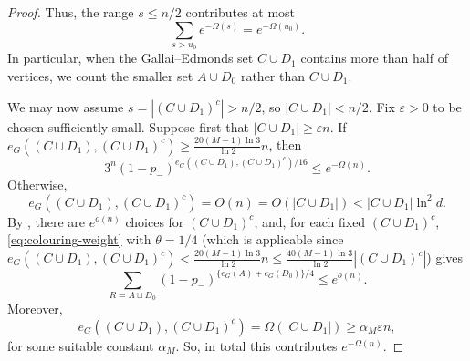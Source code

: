 \documentclass[10pt,a4paper]{amsart}
\begin{document}
\begin{proof}
Thus, the range $s \leq n/2$ contributes at most
\begin{equation}\label{eq:small-side-sum}
 \sum_{s>u_0}e^{-\Omega(s)}=e^{-\Omega(u_0)}.
\end{equation}
In particular, when the Gallai--Edmonds set $C \cup D_1$ contains more than half of vertices, we count the smaller set $A\cup D_0$ rather than $C \cup D_1$.

We may now assume $s=|(C \cup D_1)^c|>n/2$, so $|C \cup D_1|<n/2$.
Fix $\varepsilon>0$ to be chosen sufficiently small. Suppose first that $|C \cup D_1|\ge\varepsilon n$.
If $e_G((C \cup D_1), (C \cup D_1)^c)\ge \frac{20(M-1) \ln 3}{\ln 2}n$, then
\[
 3^n (1-p_-)^{e_G((C \cup D_1), (C \cup D_1)^c)/16}\le e^{-\Omega(n)}.
\]
Otherwise,
\[
 e_G((C \cup D_1), (C \cup D_1)^c)=O(n)=O(|C \cup D_1|)< |C \cup D_1|\ln^2 d.
\]
By , there are $e^{o(n)}$ choices for $(C \cup D_1)^c$, and, for each fixed $(C \cup D_1)^c$, \eqref{eq:colouring-weight} with $\theta=1/4$ (which is applicable since $e_G((C \cup D_1), (C \cup D_1)^c)<\frac{20(M-1) \ln 3}{\ln 2}n\le\frac{40(M-1) \ln 3}{\ln 2}|(C \cup D_1)^c|$) gives
\[
 \sum_{R=A\sqcup D_0}
 (1-p_-)^{\{e_G(A)+e_G(D_0)\}/4}\le e^{o(n)}.
\]
Moreover,
\[
 e_G((C \cup D_1), (C \cup D_1)^c)=\Omega(|C \cup D_1|)\ge \alpha_M\varepsilon n,
\]
for some suitable constant $\alpha_M$.
So, in total this contributes $e^{-\Omega(n)}$.


\end{proof}
\end{document}
